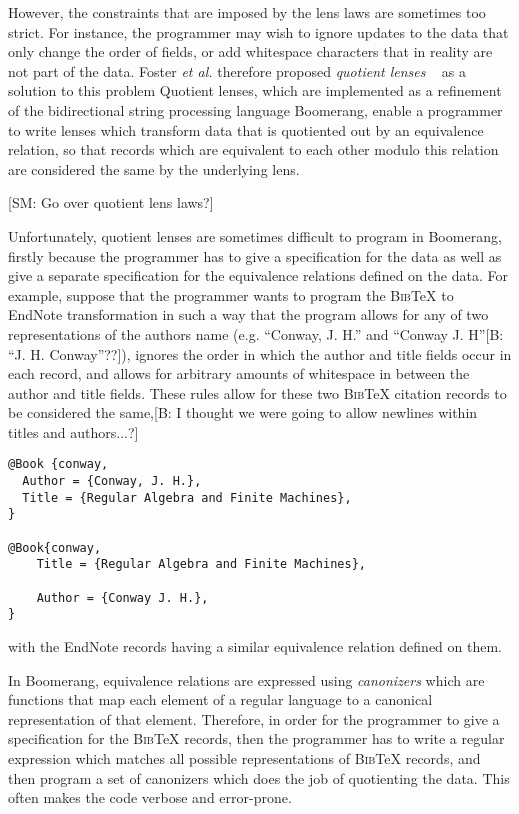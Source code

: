 \documentclass{svproc}
\newcommand{\FINISH}[3]{\ifdraft\textcolor{#1}{[#2: #3]}\fi}
\newcommand{\bcp}[1]{\FINISH{dkred}{B}{#1}}
\newcommand{\sam}[1]{\FINISH{dkpurple}{SM}{#1}}
\newcommand{\bibtex}{\textsc{Bib}\TeX{}}
\begin{document}
However, the constraints that are imposed by the lens laws are sometimes too
strict. For instance, the programmer may wish to ignore updates to the data
that only change the order of fields, or add whitespace characters that in
reality are not part of the data. Foster {\em et al.\relax} therefore proposed
\textit{quotient lenses} ~\cite{quotient} as a solution to this problem
Quotient lenses, which are implemented as a refinement of the bidirectional
string processing language Boomerang, enable a programmer to write lenses which
transform data that is quotiented out by an equivalence relation, so that
records which are equivalent to each other modulo this relation are considered
the same by the underlying lens.

\sam{Go over quotient lens laws?}

Unfortunately, quotient lenses are sometimes difficult to program in Boomerang,
firstly because the programmer has to give a specification for the data as well
as give a separate specification for the equivalence relations defined on the
data. For example, suppose that the programmer wants to program the \bibtex{} to
EndNote transformation in such a way that the program allows for any of two
representations of the authors name (e.g. ``Conway, J. H.'' and ``Conway
J. H''\bcp{``J. H. Conway''??}), 
ignores the order in which the author and title fields occur in each record,
and allows for arbitrary amounts of whitespace in between the author and title
fields. These rules allow for these two \bibtex{} citation records to be
considered the same,\bcp{I thought
  we were going to allow newlines within titles and authors...?}

\begin{verbatim}
@Book {conway,
  Author = {Conway, J. H.},
  Title = {Regular Algebra and Finite Machines},
}

@Book{conway,
    Title = {Regular Algebra and Finite Machines},
        
    Author = {Conway J. H.},
}
\end{verbatim}

with the EndNote records having a similar equivalence relation defined on them.

In Boomerang, equivalence relations are expressed using {\em canonizers}
which are functions that map each element of a regular language to a
canonical representation of that element. Therefore, in order for the programmer
to give a specification for the \bibtex{} records, then the programmer
has to write a regular expression which matches all possible representations of
\bibtex{} records, and then program a set of canonizers which does the job of
quotienting the data. This often makes the code verbose and error-prone.
\end{document}
